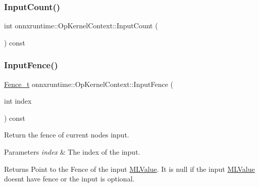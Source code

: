 \subsubsection{\texorpdfstring{Input\+Count()}{InputCount()}}
{\footnotesize\ttfamily int onnxruntime\+::\+Op\+Kernel\+Context\+::\+Input\+Count (\begin{DoxyParamCaption}{ }\end{DoxyParamCaption}) const\hspace{0.3cm}{\ttfamily [inline]}}

\mbox{\label{classonnxruntime_1_1OpKernelContext_a248e10d4549d836294cfee933098c71f}} 
\subsubsection{\texorpdfstring{Input\+Fence()}{InputFence()}}
{\footnotesize\ttfamily \mbox{\hyperlink{namespaceonnxruntime_a71ef3c4da6339a3625cdf4c4937e4913}{Fence\+\_\+t}} onnxruntime\+::\+Op\+Kernel\+Context\+::\+Input\+Fence (\begin{DoxyParamCaption}\item[{int}]{index }\end{DoxyParamCaption}) const}

Return the fence of current node\textquotesingle{}s input. 
\begin{DoxyParams}{Parameters}
{\em index} & The index of the input. \\
\hline
\end{DoxyParams}
\begin{DoxyReturn}{Returns}
Point to the Fence of the input \mbox{\hyperlink{classonnxruntime_1_1MLValue}{M\+L\+Value}}. It is null if the input \mbox{\hyperlink{classonnxruntime_1_1MLValue}{M\+L\+Value}} doesn\textquotesingle{}t have fence or the input is optional. 
\end{DoxyReturn}
\mbox{\label{classonnxruntime_1_1OpKernelContext_a06c1e42dcfddb17f96c9e31cc1185027}} 

